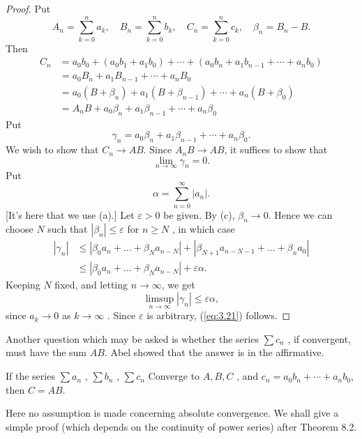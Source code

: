 \begin{proof}
    Put
    \begin{equation*}
        A_n = \sum_{k=0}^{n} a_k, \quad
        B_n = \sum_{k=0}^{n} b_k, \quad
        C_n = \sum_{k=0}^{n} c_k, \quad
        \beta_n = B_n - B.
    \end{equation*}
    Then
    \begin{align*}
        C_n
        &= a_0 b_0 + (a_0 b_1 + a_1 b_0) + \cdots + (a_0 b_n + a_1 b_{n-1} + \cdots + a_n b_0) \\
        &= a_0 B_n + a_1 B_{n-1} + \cdots + a_n B_0 \\
        &= a_0 (B + \beta_n) + a_1 ( B + \beta_{n-1}) + \cdots + a_n (B + \beta_0)\\
        & = A_n B + a_0 \beta_n + a_1 \beta_{n-1} + \cdots + a_n \beta_0
    \end{align*}
    Put 
    \begin{equation*}
        \gamma_n = a_0 \beta_n + a_1 \beta_{n-1} + \cdots + a_n \beta_0.
    \end{equation*}
    We wish to show that $C_n \rightarrow AB$. Since $A_n B \rightarrow AB$, it suffices to show that
    \begin{equation}
        \label{eq:3.21}
        \lim_{n \to \infty} \gamma_n = 0.
    \end{equation}
    Put 
    \begin{equation*}
        \alpha = \sum_{n=0}^{\infty} |a_n|.
    \end{equation*}
    [It's here that we use (a).]
    Let $\varepsilon > 0$ be given.
    By (c), $\beta_n \rightarrow 0$.
    Hence we can choose $N$ such that $\left| \beta_n \right| \leq \varepsilon$ for $n \geq N$ , in which case 
    \begin{align*}
        \left| \gamma_n \right| 
        &\leq \left| \beta_0 a_n + \dots + \beta_N a_{n-N} \right| 
        + \left| \beta_{N+1} a_{n-N-1} + \dots + \beta_n a_{0} \right| \\
        &\leq \left| \beta_0 a_n + \dots + \beta_N a_{n-N} \right| 
        + \varepsilon \alpha.
    \end{align*}
    Keeping $N$ fixed, and letting $n \rightarrow \infty$,
    we get 
    \begin{equation*}
        \limsup_{n \to \infty} \left| \gamma_n \right| \leq \varepsilon \alpha,
    \end{equation*}
    since $a_k \rightarrow 0$ as $k \rightarrow \infty$ .
    Since $\varepsilon$ is arbitrary, (\ref{eq:3.21}) follows.
\end{proof}

Another question which may be asked is whether the series $\sum c_n$ ,
if convergent, must have the sum $AB$. 
Abel showed that the answer is in the affirmative.

\begin{thm}
    \label{thm:3.51}
    If the series 
    $\sum a_n$ , 
    $\sum b_n$ , 
    $\sum c_n$  
    Converge to $A, B, C$ ,
    and $c_n = a_0 b_n + \cdots + a_n b_0$,
    then $C = AB$.  
\end{thm}

Here no assumption is made concerning absolute convergence.
We shall give a simple proof 
(which depends on the continuity of power series) after Theorem 8.2.